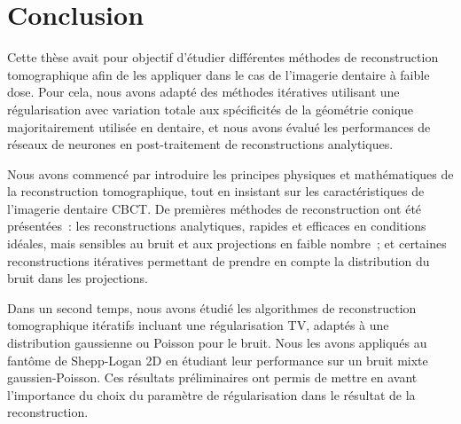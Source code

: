 \chapter*{Conclusion}
	\graphicspath{{Conclusion/}}
	\label{chap:conclusion}

Cette thèse avait pour objectif d'étudier différentes méthodes de reconstruction tomographique afin de les appliquer dans le cas de l'imagerie dentaire à faible dose. Pour cela, nous avons adapté des méthodes itératives utilisant une régularisation avec variation totale aux spécificités de la géométrie conique majoritairement utilisée en dentaire, et nous avons évalué les performances de réseaux de neurones en post-traitement de reconstructions analytiques. 

Nous avons commencé par introduire les principes physiques et mathématiques de la reconstruction tomographique, tout en insistant sur les caractéristiques de l'imagerie dentaire CBCT. De premières méthodes de reconstruction ont été présentées~: les reconstructions analytiques, rapides et efficaces en conditions idéales, mais sensibles au bruit et aux projections en faible nombre\, ; et certaines reconstructions itératives permettant de prendre en compte la distribution du bruit dans les projections. 

Dans un second temps, nous avons étudié les algorithmes de reconstruction tomographique itératifs incluant une régularisation TV, adaptés à une distribution gaussienne ou Poisson pour le bruit. Nous les avons appliqués au fantôme de Shepp-Logan 2D en étudiant leur performance sur un bruit mixte gaussien-Poisson. Ces résultats préliminaires ont permis de mettre en avant l'importance du choix du paramètre de régularisation dans le résultat de la reconstruction. 

